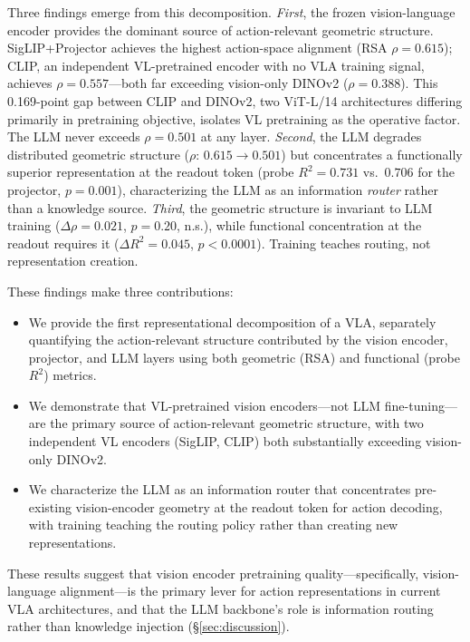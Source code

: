 Three findings emerge from this decomposition.
\emph{First}, the frozen vision-language encoder provides the dominant source of action-relevant geometric structure.
SigLIP+Projector achieves the highest action-space alignment (RSA $\rho = 0.615$); CLIP, an independent VL-pretrained encoder with no VLA training signal, achieves $\rho = 0.557$---both far exceeding vision-only DINOv2 ($\rho = 0.388$).
This 0.169-point gap between CLIP and DINOv2, two ViT-L/14 architectures differing primarily in pretraining objective, isolates VL pretraining as the operative factor.
The LLM never exceeds $\rho = 0.501$ at any layer.
\emph{Second}, the LLM degrades distributed geometric structure ($\rho$: $0.615 \to 0.501$) but concentrates a functionally superior representation at the readout token (probe $R^2 = 0.731$ vs.\ $0.706$ for the projector, $p = 0.001$), characterizing the LLM as an information \emph{router} rather than a knowledge source.
\emph{Third}, the geometric structure is invariant to LLM training ($\Delta\rho = 0.021$, $p = 0.20$, n.s.), while functional concentration at the readout requires it ($\Delta R^2 = 0.045$, $p < 0.0001$).
Training teaches routing, not representation creation.

These findings make three contributions:
\begin{itemize}[nosep,leftmargin=*]
  \item We provide the first representational decomposition of a VLA, separately quantifying the action-relevant structure contributed by the vision encoder, projector, and LLM layers using both geometric (RSA) and functional (probe $R^2$) metrics.
  \item We demonstrate that VL-pretrained vision encoders---not LLM fine-tuning---are the primary source of action-relevant geometric structure, with two independent VL encoders (SigLIP, CLIP) both substantially exceeding vision-only DINOv2.
  \item We characterize the LLM as an information router that concentrates pre-existing vision-encoder geometry at the readout token for action decoding, with training teaching the routing policy rather than creating new representations.
\end{itemize}
These results suggest that vision encoder pretraining quality---specifically, vision-language alignment---is the primary lever for action representations in current VLA architectures, and that the LLM backbone's role is information routing rather than knowledge injection (\S\ref{sec:discussion}).
